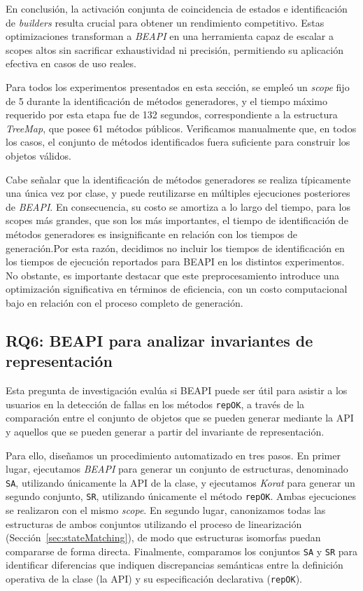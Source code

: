 En conclusión, la activación conjunta de coincidencia de estados e identificación de \emph{builders} 
resulta crucial para obtener un rendimiento competitivo. Estas optimizaciones transforman a \emph{BEAPI} 
en una herramienta capaz de escalar a scopes altos sin sacrificar exhaustividad ni precisión, 
permitiendo su aplicación efectiva en casos de uso reales.

Para todos los experimentos presentados en esta sección, se empleó un \emph{scope} fijo de 5 durante la 
identificación de métodos generadores, y el tiempo máximo requerido por esta etapa fue de 132 segundos, 
correspondiente a la estructura \emph{TreeMap}, que posee 61 métodos públicos. Verificamos manualmente que, 
en todos los casos, el conjunto de métodos identificados fuera suficiente para construir los objetos válidos.

Cabe señalar que la identificación de métodos generadores se realiza típicamente una única vez por clase, 
y puede reutilizarse en múltiples ejecuciones posteriores de \emph{BEAPI}. En consecuencia, su costo se 
amortiza a lo largo del tiempo, para los scopes más grandes, que son los más importantes, el tiempo de identificación de 
métodos generadores es insignificante en relación con los tiempos de generación.Por esta razón, decidimos no incluir los tiempos de identificación 
en los tiempos de ejecución reportados para \textsf{BEAPI} en los distintos experimentos.
No obstante, es importante destacar que este preprocesamiento introduce una optimización significativa en 
términos de eficiencia, con un costo computacional bajo en relación con el proceso completo de generación. 





\subsection{RQ6: BEAPI para analizar invariantes de representación}
\label{sec:existing-specs-analysis}

Esta pregunta de investigación evalúa si \textsf{BEAPI} puede ser útil para asistir a los usuarios 
en la detección de fallas en los métodos \texttt{repOK}, a través de la comparación entre el conjunto 
de objetos que se pueden generar mediante la API y aquellos que se pueden generar a partir del 
invariante de representación.

Para ello, diseñamos un procedimiento automatizado en tres pasos. En primer lugar, ejecutamos 
\emph{BEAPI} para generar un conjunto de estructuras, denominado \texttt{SA}, utilizando únicamente 
la API de la clase, y ejecutamos \emph{Korat} para generar un segundo conjunto, \texttt{SR}, 
utilizando únicamente el método \texttt{repOK}. Ambas ejecuciones se realizaron con el mismo 
\emph{scope}. En segundo lugar, canonizamos todas las estructuras de ambos conjuntos utilizando el 
proceso de linearización (Sección~\ref{sec:stateMatching}), de modo que estructuras isomorfas puedan 
compararse de forma directa. Finalmente, comparamos los conjuntos \texttt{SA} y \texttt{SR} para 
identificar diferencias que indiquen discrepancias semánticas entre la definición operativa de la 
clase (la API) y su especificación declarativa (\texttt{repOK}).

